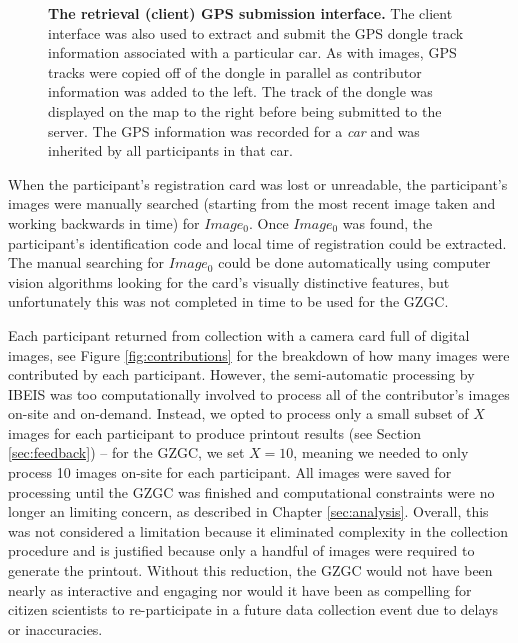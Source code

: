 \begin{figure}[t]%
	\centering
    	\caption[The Retrieval (Client) GPS Submission Interface]{\textbf{The retrieval (client) GPS submission interface.}  The client interface was also used to extract and submit the GPS dongle track information associated with a particular car.  As with images, GPS tracks were copied off of the dongle in parallel as contributor information was added to the left.  The track of the dongle was displayed on the map to the right before being submitted to the server.  The GPS information was recorded for a \textit{car} and was inherited by all participants in that car.}
    	\label{fig:client-gps}
\end{figure}

When the participant's registration card was lost or unreadable, the participant's images were manually searched (starting from the most recent image taken and working backwards in time) for $Image_0$.  Once $Image_0$ was found, the participant's identification code and local time of registration could be extracted.  The manual searching for $Image_0$ could be done automatically using computer vision algorithms looking for the card's visually distinctive features, but unfortunately this was not completed in time to be used for the GZGC.

Each participant returned from collection with a camera card full of digital images, see Figure \ref{fig:contributions} for the breakdown of how many images were contributed by each participant.  However, the semi-automatic processing by IBEIS was too computationally involved to process all of the contributor's images on-site and on-demand.  Instead, we opted to process only a small subset of $X$ images for each participant to produce printout results (see Section \ref{sec:feedback}) -- for the GZGC, we set $X=10$, meaning we needed to only process 10 images on-site for each participant.  All images were saved for processing until the GZGC was finished and computational constraints were no longer an limiting concern, as described in Chapter \ref{sec:analysis}.  Overall, this was not considered a limitation because it eliminated complexity in the collection procedure and is justified because only a handful of images were required to generate the printout.  Without this reduction, the GZGC would not have been nearly as interactive and engaging nor would it have been as compelling for citizen scientists to re-participate in a future data collection event due to delays or inaccuracies.

